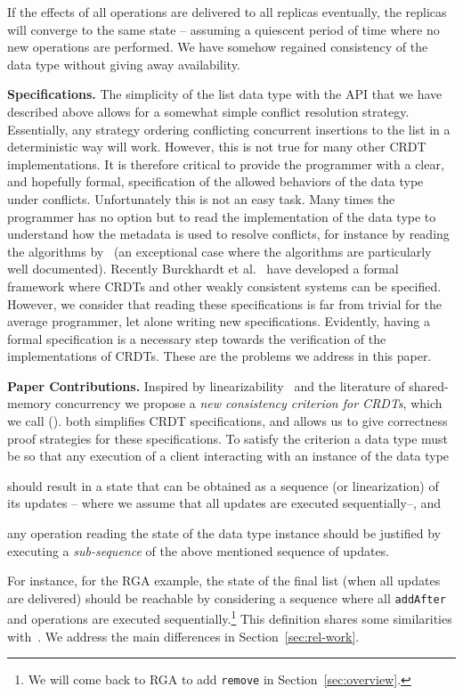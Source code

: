If the effects of all operations are
delivered to all replicas eventually, the replicas will converge to
the same state -- assuming a quiescent period of time where no new
operations are performed.
%
We have somehow regained consistency of the data type without
giving away availability.

\smallskip
\noindent
{\bf Specifications.}
The simplicity of the list data type with the API that we have
described above allows for a somewhat simple conflict resolution
strategy.
%
Essentially, any strategy ordering conflicting concurrent insertions
to the list in a deterministic way will work.
%
However, this is not true for many other CRDT implementations.
%
It is therefore critical to provide the programmer with a clear, and
hopefully formal, specification of the allowed behaviors of the data
type under conflicts.
%
Unfortunately this is not an easy task.
%
Many times the programmer has no option but to read the implementation
of the data type to understand how the metadata is used to 
resolve conflicts, for instance by reading the algorithms
by~\citet{ShapiroPBZ11} (an exceptional case where the algorithms are
particularly well documented).
%
Recently Burckhardt et al.~\cite{BurckhardtGYZ14, Burckhardt14} have
developed a formal framework where CRDTs and other weakly
consistent systems can be specified.
%
However, we consider that reading these specifications is far from
trivial for the average programmer, let alone writing new
specifications.
%
Evidently, having a formal specification is a necessary step towards
the verification of the implementations of CRDTs.
%
These are the problems we address in this paper.

\noindent
{\bf Paper Contributions.}
Inspired by linearizability~\cite{HerlihyW90} and the literature of
shared-memory concurrency we propose a \emph{new consistency criterion
  for CRDTs}, which we call \emph{\CRDTLin{}} (\CRDTLinshort{}).
%
\CRDTLinshort{} both simplifies CRDT specifications, and allows us to
give correctness proof strategies for these specifications.
%
To satisfy the \CRDTLinshort{} criterion a data type must be so that
any execution of a client interacting with an instance of the data
type
\begin{inparaenum}
\item should result in a state that can be obtained as a sequence (or
  linearization) of its updates -- where we assume that all updates
  are executed sequentially--, and
\item any operation reading the state of the data type instance should
  be justified by executing a \emph{sub-sequence} of the above
  mentioned sequence of updates.
\end{inparaenum}
For instance, for the RGA example, the state of the final
list (when all updates are delivered) should be reachable by considering a sequence where all
\lstinline|addAfter| and  operations are executed sequentially.\footnote{We
  will come back to RGA to add \lstinline|remove|
  in Section~\ref{sec:overview}.}
%
This definition shares some similarities with~\citet{PerrinMJ14}. 
%
We address the main differences in Section~\ref{sec:rel-work}.

